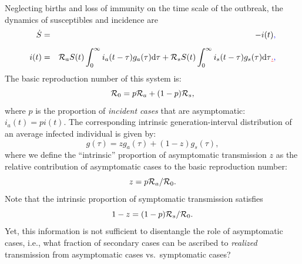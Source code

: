 Neglecting births and loss of immunity on the time scale of the outbreak, the dynamics of susceptibles and incidence are \DIFdelbegin \DIFdel{:
}\DIFdelend \DIFaddbegin {}\DIFaddend \begin{eqnarray}
\dot{S}&=&-i(t)\DIFaddbegin \DIFadd{, }\DIFaddend \\
i(t)&=&\mathcal R_a S(t) \int_0^\infty i_a(t-\tau) g_a(\tau) \mathrm{d}\tau + \mathcal R_s S(t) \int_0^\infty i_s(t-\tau) g_s(\tau) \mathrm{d}\tau\DIFdelbegin \DIFdel{.
}\DIFdelend \DIFaddbegin \DIFadd{,
}\DIFaddend \end{eqnarray}
\DIFaddbegin {}\DIFaddend The basic reproduction number of this system is:
\begin{equation}
{\cal{R}}_{0}= p {\cal{R}}_a + (1-p) {\cal{R}}_s,
\end{equation}
where $p$ is the proportion of \emph{incident cases} that are asymptomatic: $i_a(t) = p i(t)$.
The corresponding intrinsic generation-interval distribution of an average infected individual is given by: 
\begin{equation}
g(\tau) = z g_a(\tau) + (1-z) g_s(\tau),
\end{equation}
where we define the ``intrinsic'' proportion of asymptomatic transmission $z$ as the relative contribution of asymptomatic cases to the basic reproduction number:
\begin{equation}
z = p {\cal{R}}_a/{\cal{R}}_{0}.
\end{equation}
Note that the intrinsic proportion of symptomatic transmission satisfies
\begin{equation}
1-z = (1-p) {\cal{R}}_s/{\cal{R}}_{0}.
\end{equation}
Yet, this information is not sufficient to disentangle the role of asymptomatic cases, i.e., what fraction of secondary cases can be ascribed to \emph{realized} transmission from asymptomatic cases vs.~symptomatic cases?

